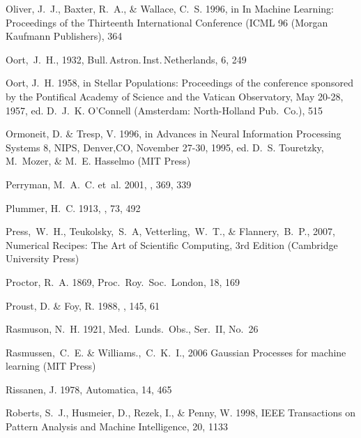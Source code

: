 \begin{thebibliography}{99}
{Oliver}, J.~J., {Baxter}, R.~A., \& {Wallace}, C.~S. 1996, in In Machine
  Learning: Proceedings of the Thirteenth International Conference (ICML 96
  (Morgan Kaufmann Publishers), 364

  Oort,~J.~H., 1932,
  Bull.\,Astron.\,Inst.\,Netherlands, 6, 249

{Oort}, J.~H. 1958, in {Stellar Populations: Proceedings of the conference
  sponsored by the Pontifical Academy of Science and the Vatican Observatory,
  May 20-28, 1957}, ed. D.~J.~K. {O'Connell} ({Amsterdam}: {North-Holland
  Pub.~Co.}), 515

{Ormoneit}, D. \& {Tresp}, V. 1996, in {Advances in Neural Information
  Processing Systems 8, NIPS, Denver,CO, November 27-30, 1995}, ed. D.~S.
  {Touretzky}, M.~{Mozer}, \& M.~E. {Hasselmo} (MIT Press)

{Perryman}, M.~A.~C. {et~al.} 2001, \aap, 369, 339

{Plummer}, H.~C. 1913, \mnras, 73, 492

  Press,~W.~H., Teukolsky,~S.~A, Vetterling,~W.~T., \& Flannery,~B.~P., 2007,
  Numerical Recipes: The Art of Scientific Computing, 3rd Edition (Cambridge University Press)

{Proctor}, R.~A. 1869, Proc.~Roy.~Soc.~London, 18, 169

{Proust}, D. \& {Foy}, R. 1988, \apss, 145, 61

{Rasmuson}, N.~H. 1921, Med.~Lunds.~Obs., {Ser.~II}, {No.~26}

  Rasmussen,~C.~E. \& Williams.,~C.~K.~I., 2006
  Gaussian Processes for machine learning (MIT Press)

{Rissanen}, J. 1978, {Automatica}, 14, 465

{Roberts}, S.~J., {Husmeier}, D., {Rezek}, I., \& {Penny}, W. 1998, IEEE
  Transactions on Pattern Analysis and Machine Intelligence, 20, 1133


\end{thebibliography}
